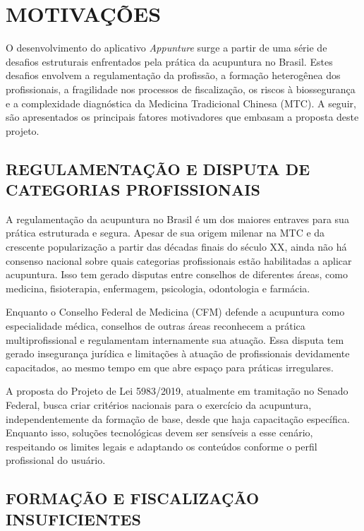 \chapter{MOTIVAÇÕES} \label{cha:motivacoes}

O desenvolvimento do aplicativo \textit{Appunture} surge a partir de uma série de desafios estruturais enfrentados pela prática da acupuntura no Brasil. Estes desafios envolvem a regulamentação da profissão, a formação heterogênea dos profissionais, a fragilidade nos processos de fiscalização, os riscos à biossegurança e a complexidade diagnóstica da Medicina Tradicional Chinesa (MTC). A seguir, são apresentados os principais fatores motivadores que embasam a proposta deste projeto.

\section{REGULAMENTAÇÃO E DISPUTA DE CATEGORIAS PROFISSIONAIS} \label{sec:regulamentacao}

A regulamentação da acupuntura no Brasil é um dos maiores entraves para sua prática estruturada e segura. Apesar de sua origem milenar na MTC e da crescente popularização a partir das décadas finais do século XX, ainda não há consenso nacional sobre quais categorias profissionais estão habilitadas a aplicar acupuntura. Isso tem gerado disputas entre conselhos de diferentes áreas, como medicina, fisioterapia, enfermagem, psicologia, odontologia e farmácia.

Enquanto o Conselho Federal de Medicina (CFM) defende a acupuntura como especialidade médica, conselhos de outras áreas reconhecem a prática multiprofissional e regulamentam internamente sua atuação. Essa disputa tem gerado insegurança jurídica e limitações à atuação de profissionais devidamente capacitados, ao mesmo tempo em que abre espaço para práticas irregulares.

A proposta do Projeto de Lei 5983/2019, atualmente em tramitação no Senado Federal, busca criar critérios nacionais para o exercício da acupuntura, independentemente da formação de base, desde que haja capacitação específica. Enquanto isso, soluções tecnológicas devem ser sensíveis a esse cenário, respeitando os limites legais e adaptando os conteúdos conforme o perfil profissional do usuário.

\section{FORMAÇÃO E FISCALIZAÇÃO INSUFICIENTES} \label{sec:formacao}

